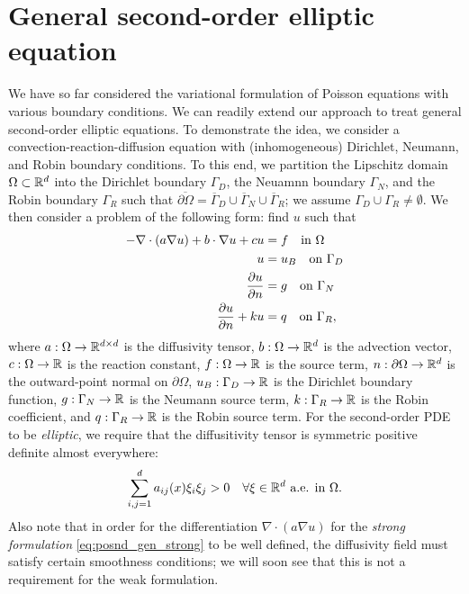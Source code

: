 \section{General second-order elliptic equation}
We have so far considered the variational formulation of Poisson equations with various boundary conditions. We can readily extend our approach to treat general second-order elliptic equations. To demonstrate the idea, we consider a convection-reaction-diffusion equation with (inhomogeneous) Dirichlet, Neumann, and Robin boundary conditions. To this end, we partition the Lipschitz domain $\Omega \subset \mathbb{R}^d$ into the Dirichlet boundary $\Gamma_D$, the Neuamnn boundary $\Gamma_N$, and the Robin boundary $\Gamma_R$ such that $\overline{\partial \Omega} = \overline{\Gamma}_D \cup \overline{\Gamma}_N \cup \overline{\Gamma}_R$; we assume $\Gamma_D \cup \Gamma_R \neq \emptyset$. We then consider a problem of the following form: find $u$ such that
\begin{align}
  - \nabla \cdot (a \nabla u) + b \cdot \nabla u + c u &= f \quad \text{in } \Omega
  \notag \\
  u &= u_B \quad \text{on } \Gamma_D \label{eq:posnd_gen_strong} \\
  \frac{\partial u}{\partial n} &= g \quad \text{on } \Gamma_N \notag \\
  \frac{\partial u}{\partial n}+ k u &= q \quad \text{on } \Gamma_R, \notag
\end{align}
where $a: \Omega \to \mathbb{R}^{d \times d}$ is the diffusivity tensor, $b: \Omega \to \mathbb{R}^d$ is the advection vector, $c: \Omega \to \mathbb{R}$ is the reaction constant, $f: \Omega \to \mathbb{R}$ is the source term,  $n: \partial \Omega \to \mathbb{R}^d$ is the outward-point normal on $\partial \Omega$, $u_B: \Gamma_D \to \mathbb{R}$ is the Dirichlet boundary function, $g: \Gamma_N \to \mathbb{R}$ is the Neumann source term, $k: \Gamma_R \to \mathbb{R}$ is the Robin coefficient, and $q: \Gamma_R \to \mathbb{R}$ is the Robin source term.  For the second-order PDE to be \emph{elliptic}, we require that the diffusitivity tensor is symmetric positive definite almost everywhere:
\begin{equation*}
  \sum_{i,j=1}^d a_{ij}(x) \xi_i \xi_j > 0 \quad \forall \xi \in \mathbb{R}^d \text{ a.e. in } \Omega.
\end{equation*}
Also note that in order for the differentiation $\nabla \cdot ( a \nabla u)$ for the \emph{strong formulation} \eqref{eq:posnd_gen_strong} to be well defined, the diffusivity field must satisfy certain smoothness conditions; we will soon see that this is not a requirement for the weak formulation.

